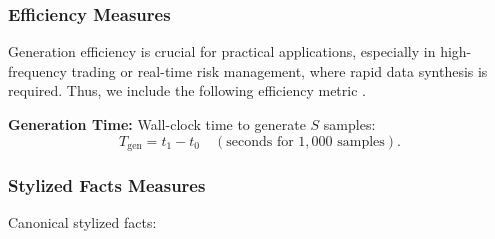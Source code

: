 \documentclass[sigconf]{acmart}
\begin{document}
          \subsubsection{Efficiency Measures}
          Generation efficiency is crucial for practical applications,
          especially in high-frequency trading or real-time risk
          management, where rapid data synthesis is required.
          Thus, we include the following efficiency metric \cite{Stenger24}.
          \begin{enumerate}[label=\textbf{[M\arabic*]}, resume]
          \item \label{metric:gentime} \textbf{Generation Time:}  
          Wall-clock time to generate \(S\) samples:
          \[
          T_{\mathrm{gen}} = t_1 - t_0 \quad (\text{seconds for } 1,000
          \text{ samples}).
          \]
          \end{enumerate}
          
          \subsubsection{Stylized Facts Measures} \label{sec:stylized-facts}
          Canonical stylized facts:
          
\end{document}
